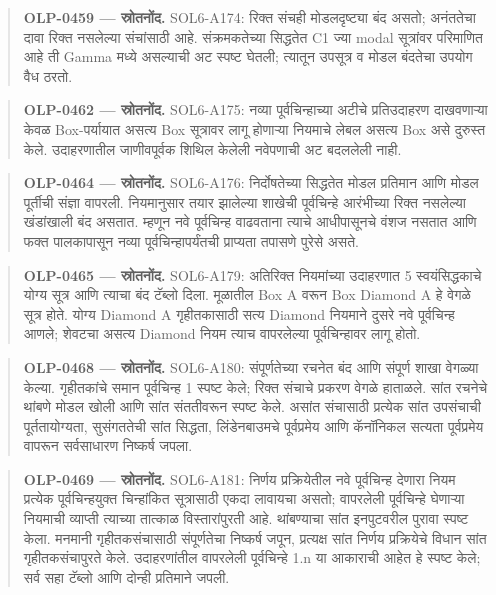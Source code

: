 \begin{quote}\small\textbf{OLP-0459 — स्रोतनोंद.} SOL6-A174: रिक्त संचही मोडलदृष्ट्या बंद असतो; अनंततेचा दावा रिक्त नसलेल्या संचांसाठी आहे. संक्रमकतेच्या सिद्धतेत C1 ज्या modal सूत्रांवर परिमाणित आहे ती Gamma मध्ये असल्याची अट स्पष्ट घेतली; त्यातून उपसूत्र व मोडल बंदतेचा उपयोग वैध ठरतो.\end{quote}
\begin{quote}\small\textbf{OLP-0462 — स्रोतनोंद.} SOL6-A175: नव्या पूर्वचिन्हाच्या अटीचे प्रतिउदाहरण दाखवणाऱ्या केवळ Box-पर्यायात असत्य Box सूत्रावर लागू होणाऱ्या नियमाचे लेबल असत्य Box असे दुरुस्त केले. उदाहरणातील जाणीवपूर्वक शिथिल केलेली नवेपणाची अट बदललेली नाही.\end{quote}
\begin{quote}\small\textbf{OLP-0464 — स्रोतनोंद.} SOL6-A176: निर्दोषतेच्या सिद्धतेत मोडल प्रतिमान आणि मोडल पूर्तीची संज्ञा वापरली. नियमानुसार तयार झालेल्या शाखेची पूर्वचिन्हे आरंभीच्या रिक्त नसलेल्या खंडांखाली बंद असतात. म्हणून नवे पूर्वचिन्ह वाढवताना त्याचे आधीपासूनचे वंशज नसतात आणि फक्त पालकापासून नव्या पूर्वचिन्हापर्यंतची प्राप्यता तपासणे पुरेसे असते.\end{quote}
\begin{quote}\small\textbf{OLP-0465 — स्रोतनोंद.} SOL6-A179: अतिरिक्त नियमांच्या उदाहरणात 5 स्वयंसिद्धकाचे योग्य सूत्र आणि त्याचा बंद टॅब्लो दिला. मूळातील Box A वरून Box Diamond A हे वेगळे सूत्र होते. योग्य Diamond A गृहीतकासाठी सत्य Diamond नियमाने दुसरे नवे पूर्वचिन्ह आणले; शेवटचा असत्य Diamond नियम त्याच वापरलेल्या पूर्वचिन्हावर लागू होतो.\end{quote}
\begin{quote}\small\textbf{OLP-0468 — स्रोतनोंद.} SOL6-A180: संपूर्णतेच्या रचनेत बंद आणि संपूर्ण शाखा वेगळ्या केल्या. गृहीतकांचे समान पूर्वचिन्ह 1 स्पष्ट केले; रिक्त संचाचे प्रकरण वेगळे हाताळले. सांत रचनेचे थांबणे मोडल खोली आणि सांत संततीवरून स्पष्ट केले. असांत संचासाठी प्रत्येक सांत उपसंचाची पूर्ततायोग्यता, सुसंगततेची सांत सिद्धता, लिंडेनबाउमचे पूर्वप्रमेय आणि कॅनॉनिकल सत्यता पूर्वप्रमेय वापरून सर्वसाधारण निष्कर्ष जपला.\end{quote}
\begin{quote}\small\textbf{OLP-0469 — स्रोतनोंद.} SOL6-A181: निर्णय प्रक्रियेतील नवे पूर्वचिन्ह देणारा नियम प्रत्येक पूर्वचिन्हयुक्त चिन्हांकित सूत्रासाठी एकदा लावायचा असतो; वापरलेली पूर्वचिन्हे घेणाऱ्या नियमाची व्याप्ती त्याच्या तात्काळ विस्तारांपुरती आहे. थांबण्याचा सांत इनपुटवरील पुरावा स्पष्ट केला. मनमानी गृहीतकसंचासाठी संपूर्णतेचा निष्कर्ष जपून, प्रत्यक्ष सांत निर्णय प्रक्रियेचे विधान सांत गृहीतकसंचापुरते केले. उदाहरणांतील वापरलेली पूर्वचिन्हे 1.n या आकाराची आहेत हे स्पष्ट केले; सर्व सहा टॅब्लो आणि दोन्ही प्रतिमाने जपली.\end{quote}
